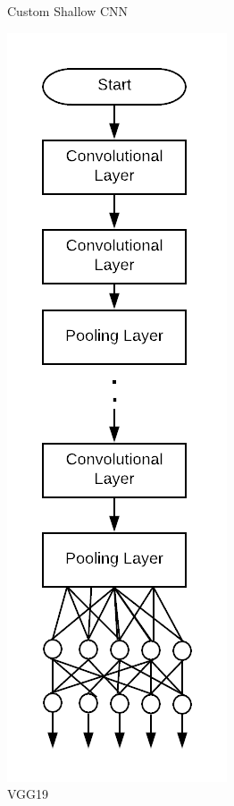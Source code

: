 \documentclass[12pt]{article}
\begin{document}
\begin{figure}[b!]
\begin{subfigure}[b]{0.3\linewidth}
				\caption{Custom Shallow CNN}
				\label{fig:shallow_cnn}
			\end{subfigure}
			\begin{subfigure}[b]{0.3\linewidth}
				\centering
				\includegraphics[scale=0.34]{img/vgg.png}
				\caption{VGG19}
			    \label{fig:deep_cnn}
			\end{subfigure}
			\begin{subfigure}[b]{0.3\linewidth}
				\centering

\end{subfigure}
\end{figure}
\end{document}
